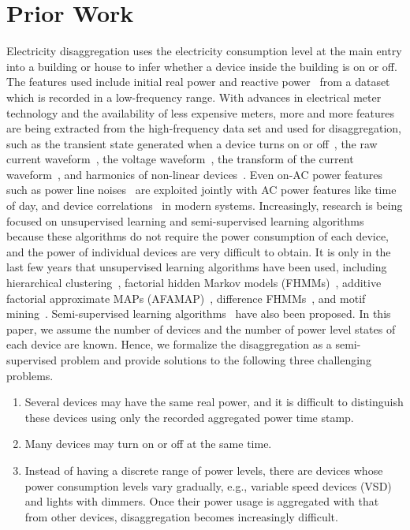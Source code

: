 \section{Prior Work}
Electricity disaggregation uses the electricity consumption level at the main entry into a building or house 
to infer whether a device inside the building is on or off. 
The features used include initial real power and reactive power~\cite{hart1992} from a dataset which is recorded in 
a low-frequency range. 
With advances in electrical meter technology and the availability of less expensive meters, 
more and more features are being extracted from the high-frequency data set and used for disaggregation, such as 
the transient state generated when a device turns on or off~\cite{shaw2000PhdThesis},
the raw current waveform~\cite{srinivasan2006neural}, the voltage waveform~\cite{lam2007novel}, 
the transform of the current waveform~\cite{chan2000harmonics}, 
and harmonics of non-linear devices~\cite{chan2000harmonics}. 
Even on-AC power features such as power line noises~\cite{patel2007flick}
are exploited jointly with AC power features like  
time of day, and device correlations~\cite{kim2011unsupervised}
in modern systems.
Increasingly,  
research is being focused on unsupervised learning and semi-supervised learning algorithms because  
these algorithms do not require the power consumption of 
each device,   
and the power of individual devices are very difficult to obtain. 
It is only in
 the last few years that 
unsupervised learning algorithms
have been used, including
hierarchical clustering~\cite{gonccalves2011unsupervised},
factorial hidden Markov models (FHMMs)~\cite{kim2011unsupervised},
additive factorial approximate MAPs (AFAMAP)~\cite{kolter2012aistat}, 
difference FHMMs~\cite{parson2012nonintrusive}, 
and motif mining~\cite{shao2013temporal}.
Semi-supervised learning 
algorithms~\cite{lam2007novel,johnson2012bayesian} have also
been proposed.
In this paper, we assume the number of devices 
and the number of power level states of each device 
are known. Hence, we formalize the disaggregation 
as a semi-supervised problem and 
provide solutions to the following three challenging problems.
\begin{enumerate}
\item Several devices may have the same real power, and
it is difficult to distinguish these devices using only the recorded aggregated
power time stamp.
\item Many devices may turn on or off at the same time.
\item Instead of having a discrete range of power
levels, there are devices whose power consumption levels
   vary gradually, e.g.,
  variable speed devices (VSD) and lights with dimmers.
Once their power usage is aggregated with that from other devices,
disaggregation becomes increasingly difficult.
\end{enumerate}
